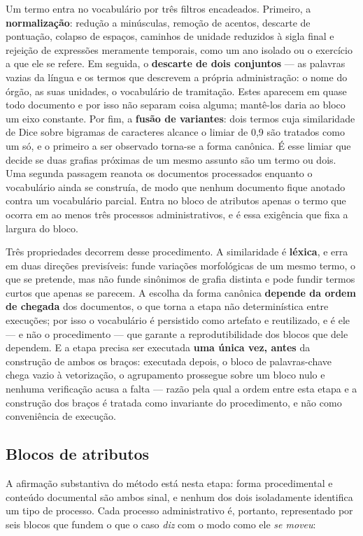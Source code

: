 Um termo entra no vocabulário por três filtros encadeados. Primeiro, a \textbf{normalização}:
redução a minúsculas, remoção de acentos, descarte de pontuação, colapso de espaços, caminhos de
unidade reduzidos à sigla final e rejeição de expressões meramente temporais, como um ano isolado
ou o exercício a que ele se refere. Em seguida, o \textbf{descarte de dois conjuntos} --- as
palavras vazias da língua e os termos que descrevem a própria administração: o nome do órgão, as
suas unidades, o vocabulário de tramitação. Estes aparecem em quase todo documento e por isso não
separam coisa alguma; mantê-los daria ao bloco um eixo constante. Por fim, a \textbf{fusão de
variantes}: dois termos cuja similaridade de Dice sobre bigramas de caracteres alcance o limiar de
0,9 são tratados como um só, e o primeiro a ser observado torna-se a forma canônica. É esse limiar
que decide se duas grafias próximas de um mesmo assunto são um termo ou dois. Uma segunda passagem
reanota os documentos processados enquanto o vocabulário ainda se construía, de modo que nenhum
documento fique anotado contra um vocabulário parcial. Entra no bloco de atributos apenas o termo
que ocorra em ao menos três processos administrativos, e é essa exigência que fixa a largura do
bloco.

Três propriedades decorrem desse procedimento. A similaridade é
\textbf{léxica}, e erra em duas direções previsíveis: funde variações morfológicas de um mesmo
termo, o que se pretende, mas não funde sinônimos de grafia distinta e pode fundir termos curtos
que apenas se parecem. A escolha da forma canônica \textbf{depende da ordem de chegada} dos
documentos, o que torna a etapa não determinística entre execuções; por isso o vocabulário é
persistido como artefato e reutilizado, e é ele --- e não o procedimento --- que garante a
reprodutibilidade dos blocos que dele dependem. E a etapa precisa ser executada \textbf{uma única
vez, antes} da construção de ambos os braços: executada depois, o bloco de palavras-chave chega
vazio à vetorização, o agrupamento prossegue sobre um bloco nulo e nenhuma verificação acusa a
falta --- razão pela qual a ordem entre esta etapa e a construção dos braços é tratada como
invariante do procedimento, e não como conveniência de execução.

\subsection{Blocos de atributos}\label{sec:atributos}

A afirmação substantiva do método está nesta etapa: forma procedimental e conteúdo documental são
ambos sinal, e nenhum dos dois isoladamente identifica um tipo de processo. Cada processo
administrativo é, portanto, representado por seis blocos que fundem o que o caso \emph{diz} com o
modo como ele \emph{se moveu}:

